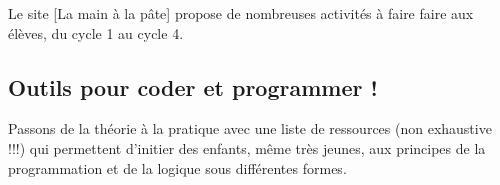 Le site [La main à la pâte] propose de nombreuses activités à faire faire aux élèves, du cycle 1 au cycle 4.


\subsection{Outils pour coder et programmer !} %

Passons de la théorie à la pratique avec une liste de ressources (non exhaustive !!!) qui permettent d'initier des enfants, même très jeunes, aux principes de la programmation et de la logique sous différentes formes.


